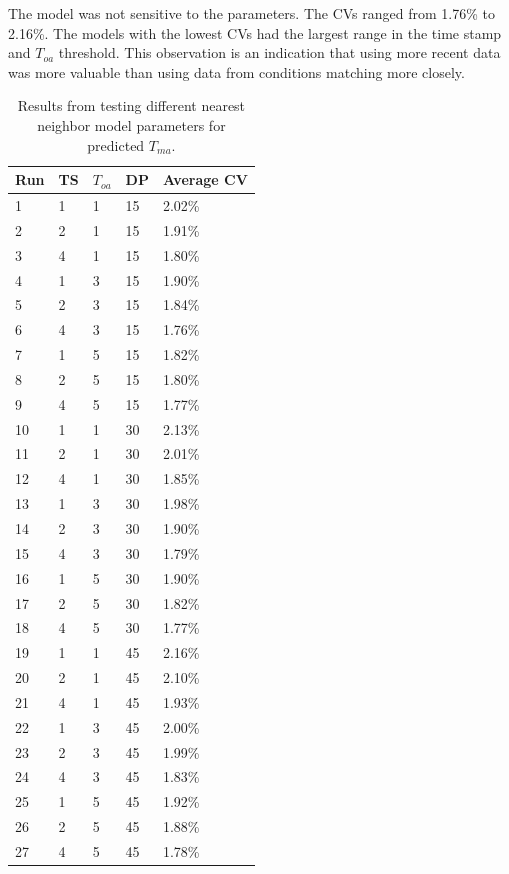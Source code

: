 The model was not sensitive to the parameters. The CVs ranged from
1.76\% to 2.16\%. The models with the lowest CVs had the largest range
in the time stamp and \(T_{oa}\) threshold. This observation is an indication that
using more recent data was more valuable than using data from conditions
matching more closely. 

\begin{table}
    \centering
    \caption{Results from testing different nearest neighbor model parameters for predicted \(T_{ma}\).}
    \label{tab:MATTestingResults}
    \begin{tabular}{@{}lllll@{}}
        \toprule
        Run & TS & \(T_{oa}\) & DP & Average CV \\ \midrule
        1   & 1  & 1          & 15 & 2.02\%     \\
        2   & 2  & 1          & 15 & 1.91\%     \\
        3   & 4  & 1          & 15 & 1.80\%     \\
        4   & 1  & 3          & 15 & 1.90\%     \\
        5   & 2  & 3          & 15 & 1.84\%     \\
        6   & 4  & 3          & 15 & 1.76\%     \\
        7   & 1  & 5          & 15 & 1.82\%     \\
        8   & 2  & 5          & 15 & 1.80\%     \\
        9   & 4  & 5          & 15 & 1.77\%     \\
        10  & 1  & 1          & 30 & 2.13\%     \\
        11  & 2  & 1          & 30 & 2.01\%     \\
        12  & 4  & 1          & 30 & 1.85\%     \\
        13  & 1  & 3          & 30 & 1.98\%     \\
        14  & 2  & 3          & 30 & 1.90\%     \\
        15  & 4  & 3          & 30 & 1.79\%     \\
        16  & 1  & 5          & 30 & 1.90\%     \\
        17  & 2  & 5          & 30 & 1.82\%     \\
        18  & 4  & 5          & 30 & 1.77\%     \\
        19  & 1  & 1          & 45 & 2.16\%     \\
        20  & 2  & 1          & 45 & 2.10\%     \\
        21  & 4  & 1          & 45 & 1.93\%     \\
        22  & 1  & 3          & 45 & 2.00\%     \\
        23  & 2  & 3          & 45 & 1.99\%     \\
        24  & 4  & 3          & 45 & 1.83\%     \\
        25  & 1  & 5          & 45 & 1.92\%     \\
        26  & 2  & 5          & 45 & 1.88\%     \\
        27  & 4  & 5          & 45 & 1.78\%     \\ \bottomrule
    \end{tabular}
\end{table}

